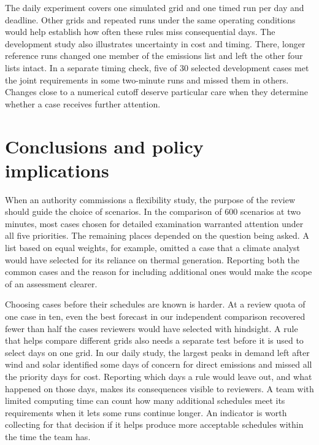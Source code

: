 \documentclass[11pt,a4paper]{article}
\begin{document}
The daily experiment covers one simulated grid and one timed run per day and deadline. Other grids and repeated runs under the same operating conditions would help establish how often these rules miss consequential days. The development study also illustrates uncertainty in cost and timing. There, longer reference runs changed one member of the emissions list and left the other four lists intact. In a separate timing check, five of 30 selected development cases met the joint requirements in some two-minute runs and missed them in others. Changes close to a numerical cutoff deserve particular care when they determine whether a case receives further attention.

\section{Conclusions and policy implications}

When an authority commissions a flexibility study, the purpose of the review should guide the choice of scenarios. In the comparison of 600 scenarios at two minutes, most cases chosen for detailed examination warranted attention under all five priorities. The remaining places depended on the question being asked. A list based on equal weights, for example, omitted a case that a climate analyst would have selected for its reliance on thermal generation. Reporting both the common cases and the reason for including additional ones would make the scope of an assessment clearer.

Choosing cases before their schedules are known is harder. At a review quota of one case in ten, even the best forecast in our independent comparison recovered fewer than half the cases reviewers would have selected with hindsight. A rule that helps compare different grids also needs a separate test before it is used to select days on one grid. In our daily study, the largest peaks in demand left after wind and solar identified some days of concern for direct emissions and missed all the priority days for cost. Reporting which days a rule would leave out, and what happened on those days, makes its consequences visible to reviewers. A team with limited computing time can count how many additional schedules meet its requirements when it lets some runs continue longer. An indicator is worth collecting for that decision if it helps produce more acceptable schedules within the time the team has.



\clearpage
\end{document}

